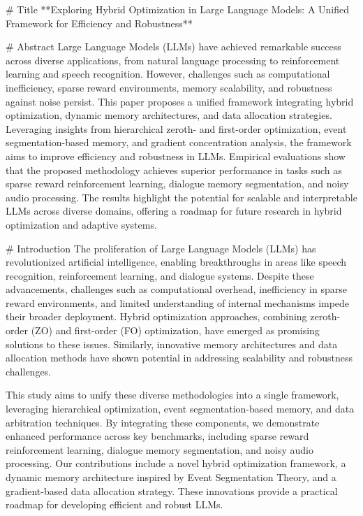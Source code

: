 # Title
**Exploring Hybrid Optimization in Large Language Models: A Unified Framework for Efficiency and Robustness**

# Abstract
Large Language Models (LLMs) have achieved remarkable success across diverse applications, from natural language processing to reinforcement learning and speech recognition. However, challenges such as computational inefficiency, sparse reward environments, memory scalability, and robustness against noise persist. This paper proposes a unified framework integrating hybrid optimization, dynamic memory architectures, and data allocation strategies. Leveraging insights from hierarchical zeroth- and first-order optimization, event segmentation-based memory, and gradient concentration analysis, the framework aims to improve efficiency and robustness in LLMs. Empirical evaluations show that the proposed methodology achieves superior performance in tasks such as sparse reward reinforcement learning, dialogue memory segmentation, and noisy audio processing. The results highlight the potential for scalable and interpretable LLMs across diverse domains, offering a roadmap for future research in hybrid optimization and adaptive systems.

# Introduction
The proliferation of Large Language Models (LLMs) has revolutionized artificial intelligence, enabling breakthroughs in areas like speech recognition, reinforcement learning, and dialogue systems. Despite these advancements, challenges such as computational overhead, inefficiency in sparse reward environments, and limited understanding of internal mechanisms impede their broader deployment. Hybrid optimization approaches, combining zeroth-order (ZO) and first-order (FO) optimization, have emerged as promising solutions to these issues. Similarly, innovative memory architectures and data allocation methods have shown potential in addressing scalability and robustness challenges.

This study aims to unify these diverse methodologies into a single framework, leveraging hierarchical optimization, event segmentation-based memory, and data arbitration techniques. By integrating these components, we demonstrate enhanced performance across key benchmarks, including sparse reward reinforcement learning, dialogue memory segmentation, and noisy audio processing. Our contributions include a novel hybrid optimization framework, a dynamic memory architecture inspired by Event Segmentation Theory, and a gradient-based data allocation strategy. These innovations provide a practical roadmap for developing efficient and robust LLMs.

